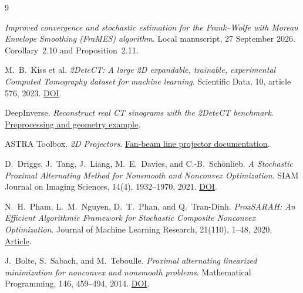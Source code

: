 \documentclass[11pt]{article}
\begin{document}
\begin{thebibliography}{9}

\emph{Improved convergence and stochastic estimation for the Frank--Wolfe with
Moreau Envelope Smoothing (FraMES) algorithm}.
Local manuscript, 27 September 2026. Corollary~2.10 and Proposition~2.11.

M.~B.~Kiss et al.
\emph{2DeteCT: A large 2D expandable, trainable, experimental Computed Tomography
dataset for machine learning}.
Scientific Data, 10, article 576, 2023.
\href{https://doi.org/10.1038/s41597-023-02484-6}{DOI}.

DeepInverse.
\emph{Reconstruct real CT sinograms with the 2DeteCT benchmark}.
\href{https://deepinv.org/auto_examples/external-libraries/demo_astra_2detect.html}{Preprocessing and geometry example}.

ASTRA Toolbox.
\emph{2D Projectors}.
\href{https://astra-toolbox.com/docs/proj2d.html#fan-beam}{Fan-beam line projector documentation}.

D.~Driggs, J.~Tang, J.~Liang, M.~E.~Davies, and C.-B.~Sch\"onlieb.
\emph{A Stochastic Proximal Alternating Method for Nonsmooth and Nonconvex Optimization}.
SIAM Journal on Imaging Sciences, 14(4), 1932--1970, 2021.
\href{https://doi.org/10.1137/20M1387213}{DOI}.

N.~H.~Pham, L.~M.~Nguyen, D.~T.~Phan, and Q.~Tran-Dinh.
\emph{ProxSARAH: An Efficient Algorithmic Framework for Stochastic Composite
Nonconvex Optimization}.
Journal of Machine Learning Research, 21(110), 1--48, 2020.
\href{https://www.jmlr.org/papers/v21/19-248.html}{Article}.

J.~Bolte, S.~Sabach, and M.~Teboulle.
\emph{Proximal alternating linearized minimization for nonconvex and nonsmooth problems}.
Mathematical Programming, 146, 459--494, 2014.
\href{https://doi.org/10.1007/s10107-013-0701-9}{DOI}.

\end{thebibliography}

\clearpage
\appendix
\end{document}
